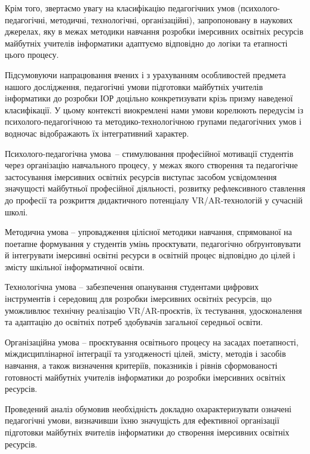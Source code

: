 Крім того, звертаємо увагу на класифікацію педагогічних умов (психолого-педагогічні, методичні, технологічні, організаційні), запропоновану в наукових джерелах, яку в межах методики навчання розробки імерсивних освітніх ресурсів майбутніх учителів інформатики адаптуємо відповідно до логіки та етапності цього процесу.

Підсумовуючи напрацювання вчених і з урахуванням особливостей предмета нашого дослідження, педагогічні умови підготовки майбутніх учителів інформатики до розробки ІОР доцільно конкретизувати крізь призму наведеної класифікації. У цьому контексті виокремлені нами умови корелюють передусім із психолого-педагогічною та методико-технологічною групами педагогічних умов і водночас відображають їх інтегративний характер.

Психолого-педагогічна умова~-- стимулювання професійної мотивації студентів через організацію навчального процесу, у межах якого створення та педагогічне застосування імерсивних освітніх ресурсів виступає засобом усвідомлення значущості майбутньої професійної діяльності, розвитку рефлексивного ставлення до професії та розкриття дидактичного потенціалу VR/AR-технологій у сучасній школі.

Методична умова -- упровадження цілісної методики навчання, спрямованої на поетапне формування у студентів умінь проєктувати, педагогічно обґрунтовувати й інтегрувати імерсивні освітні ресурси в освітній процес відповідно до цілей і змісту шкільної інформатичної освіти.

Технологічна умова -- забезпечення опанування студентами цифрових інструментів і середовищ для розробки імерсивних освітніх ресурсів, що уможливлює технічну реалізацію VR/AR-проєктів, їх тестування, удосконалення та адаптацію до освітніх потреб здобувачів загальної середньої освіти.

Організаційна умова -- проєктування освітнього процесу на засадах поетапності, міждисциплінарної інтеграції та узгодженості цілей, змісту, методів і засобів навчання, а також визначення критеріїв, показників і рівнів сформованості готовності майбутніх учителів інформатики до розробки імерсивних освітніх ресурсів.

Проведений аналіз обумовив необхідність докладно охарактеризувати означені педагогічні умови, визначивши їхню значущість для ефективної організації підготовки майбутніх вчителів інформатики до створення імерсивних освітніх ресурсів.

